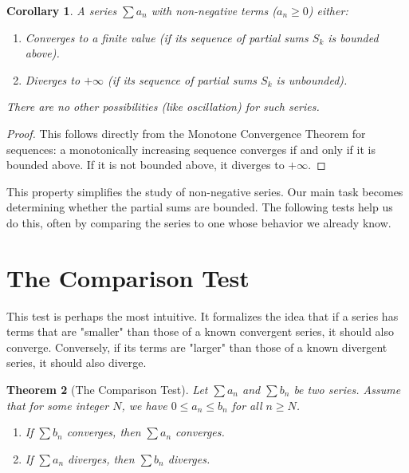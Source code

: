 \documentclass[11pt]{article}
\theoremstyle{plain}
\newtheorem{theorem}{Theorem}[section]
\newtheorem{corollary}[theorem]{Corollary}
\theoremstyle{definition}
\theoremstyle{remark}
\theoremstyle{adminstyle}
\begin{document}
\begin{corollary}
A series $\sum a_n$ with non-negative terms ($a_n \ge 0$) either:
\begin{enumerate}
    \item Converges to a finite value (if its sequence of partial sums $S_k$ is bounded above).
    \item Diverges to $+\infty$ (if its sequence of partial sums $S_k$ is unbounded).
\end{enumerate}
There are no other possibilities (like oscillation) for such series.
\end{corollary}
\begin{proof}
This follows directly from the Monotone Convergence Theorem for sequences: a monotonically increasing sequence converges if and only if it is bounded above. If it is not bounded above, it diverges to $+\infty$.
\end{proof}

This property simplifies the study of non-negative series. Our main task becomes determining whether the partial sums are bounded. The following tests help us do this, often by comparing the series to one whose behavior we already know.

\section{The Comparison Test}

This test is perhaps the most intuitive. It formalizes the idea that if a series has terms that are "smaller" than those of a known convergent series, it should also converge. Conversely, if its terms are "larger" than those of a known divergent series, it should also diverge.

\begin{theorem}[The Comparison Test]
Let $\sum a_n$ and $\sum b_n$ be two series. Assume that for some integer $N$, we have $0 \le a_n \le b_n$ for all $n \ge N$.
\begin{enumerate}
    \item If $\sum b_n$ converges, then $\sum a_n$ converges.
    \item If $\sum a_n$ diverges, then $\sum b_n$ diverges.
\end{enumerate}
\end{theorem}
\end{document}
